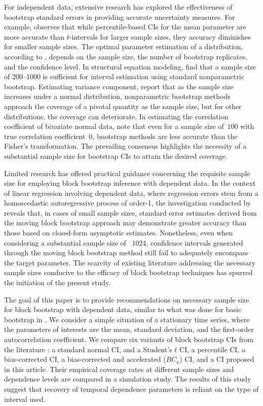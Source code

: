 \documentclass[12pt, letterpaper, titlepage]{article}
\begin{document}
For independent data, extensive research has explored the effectiveness of
bootstrap standard errors in providing accurate uncertainty measures. For
example, \citet{hesterberg2015teachers} observes that while percentile-based
CIs for the mean parameter are more accurate than $t$-intervals for larger
sample sizes, they accuracy diminishes for smaller sample sizes. The optimal
parameter estimation of a distribution, according to
\citet{chernick2009revisiting}, depends on the sample size, the number of
bootstrap replicates, and the confidence level. In structural equation
modeling, \citet{nevitt2001performance} find that a sample size of 200--1000
is sufficient for interval estimation using standard nonparametric bootstrap.
Estimating variance component, \citet{burch2012nonparametric} report that as
the sample size increases under a normal distribution, nonparametric bootstrap
methods approach the coverage of a pivotal quantity as the sample size, but
for other distributions, the coverage can deteriorate. In estimating the
correlation coefficient of bivariate normal data, \citet{puth2015variety} note
that even for a sample size of~$100$ with true correlation coefficient~0,
bootstrap methods are less accurate than the Fisher's transformation. The
prevailing consensus highlights the necessity of a substantial sample size for
bootstrap CIs to attain the desired coverage.


Limited research has offered practical guidance concerning the requisite sample
size for employing block bootstrap inference with dependent data. In the
context of linear regression involving dependent data, where regression errors
stem from a homoscedastic autoregressive process of order-1, the investigation
conducted by \citet{goncalves2005bootstrap} reveals that, in cases of small
sample sizes, standard error estimates derived from the moving block bootstrap
approach may demonstrate greater accuracy than those based on closed-form
asymptotic estimates. Nonetheless, even when considering a substantial sample
size of ~$1024$, confidence intervals generated through the moving block
bootstrap method still fail to adequately encompass the target parameter. The
scarcity of existing literature addressing the necessary sample sizes
conducive to the efficacy of block bootstrap techniques has spurred the
initiation of the present study.


The goal of this paper is to provide recommendations on necessary sample size
for block bootstrap with dependent data, similar to what was done for basic
bootstrap in \citet{hesterberg2015teachers}. We consider a simple situation of
a stationary time series, where the parameters of interests are the mean,
standard deviation, and the first-order autocorrelation coefficient. We
compare six variants of block bootstrap CIs from the literature
\citep{diciccio1996bootstrap, rice2006mathematical}: a standard normal CI, and
a Student's $t$ CI, a percentile CI, a bias-corrected CI, a bias-corrected and
accelerated ($BC_a$) CI, and a CI proposed in this article. Their empirical
coverage rates at different sample sizes and dependence levels are compared in
a simulation study. The results of this study suggest that recovery of
temporal dependence parameters is reliant on the type of interval used.
\end{document}
